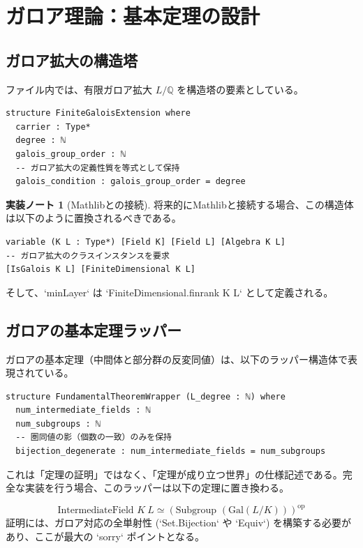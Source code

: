 \documentclass[a4paper,11pt]{ltjsarticle}
\theoremstyle{definition}
\newtheorem{remark}{実装ノート}[section]
\newcommand{\Q}{\mathbb{Q}}
\newcommand{\Gal}{\mathrm{Gal}}
\begin{document}
\section{ガロア理論：基本定理の設計}

\subsection{ガロア拡大の構造塔}
ファイル内では、有限ガロア拡大 $L/\Q$ を構造塔の要素としている。
\begin{lstlisting}[caption=ガロア拡大の定義（縮退版）]
structure FiniteGaloisExtension where
  carrier : Type*
  degree : ℕ
  galois_group_order : ℕ
  -- ガロア拡大の定義性質を等式として保持
  galois_condition : galois_group_order = degree
\end{lstlisting}

\begin{remark}[Mathlibとの接続]
将来的にMathlibと接続する場合、この構造体は以下のように置換されるべきである。
\begin{lstlisting}
variable (K L : Type*) [Field K] [Field L] [Algebra K L]
-- ガロア拡大のクラスインスタンスを要求
[IsGalois K L] [FiniteDimensional K L]
\end{lstlisting}
そして、`minLayer` は `FiniteDimensional.finrank K L` として定義される。
\end{remark}

\subsection{ガロアの基本定理ラッパー}
ガロアの基本定理（中間体と部分群の反変同値）は、以下のラッパー構造体で表現されている。

\begin{lstlisting}[caption=基本定理ラッパー]
structure FundamentalTheoremWrapper (L_degree : ℕ) where
  num_intermediate_fields : ℕ
  num_subgroups : ℕ
  -- 圏同値の影（個数の一致）のみを保持
  bijection_degenerate : num_intermediate_fields = num_subgroups
\end{lstlisting}

これは「定理の証明」ではなく、「定理が成り立つ世界」の仕様記述である。完全な実装を行う場合、このラッパーは以下の定理に置き換わる。

\begin{tcolorbox}[title=将来の実装目標 (To Be Proved)]
\[ \text{IntermediateField } K \ L \simeq (\text{Subgroup } (\Gal(L/K)))^{\text{op}} \]
証明には、ガロア対応の全単射性 (`Set.Bijection` や `Equiv`) を構築する必要があり、ここが最大の `sorry` ポイントとなる。
\end{tcolorbox}
\end{document}

